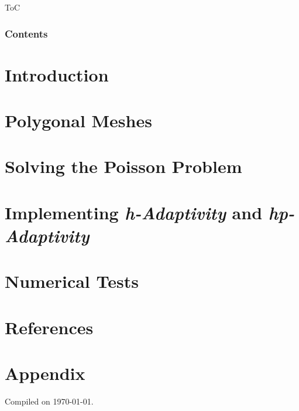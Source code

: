 \documentclass[8pt, compress]{beamer}
\title[\presentationshorttitle]{\presentationtitle}
\subtitle{Advanced Programming for Scientific Computing}
\author[Andrea Di Antonio]{Andrea Di Antonio \\ Supervised by Professors Paola F. Antonietti and Marco Verani} %
\date[September 10, 2024]{Exam session of September 10, 2024 \\ Academic Year 2023-24}
\begin{document}
    \begin{frame}
        \titlepage
    \end{frame} %

	\begin{frame}{ToC}
		\frametitle{Contents}
		\tableofcontents[hideallsubsections]
	\end{frame}

	\section{Introduction}
	

	\section{Polygonal Meshes}
	

	\section{Solving the Poisson Problem}
	

	\section{Implementing \textit{h-Adaptivity} and \textit{hp-Adaptivity}}
	

	\section{Numerical Tests}
	

	\section*{References}
	\begin{frame}[allowframebreaks]
		\nocite{*}
		\printbibliography
	\end{frame}

	\section{Appendix}
	

	\begin{frame}
		\thispagestyle{empty}
		\begin{center}
			Compiled on \today.
		\end{center}
	\end{frame}
\end{document}
